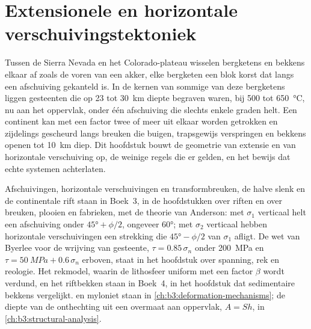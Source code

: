 \chapter{Extensionele en horizontale verschuivingstektoniek}\label{ch:b3:extension-strike-slip}

Tussen de Sierra Nevada en het Colorado-plateau wisselen bergketens en bekkens
elkaar af zoals de voren van een akker, elke bergketen een blok korst dat
langs een afschuiving gekanteld is. In de kernen van sommige van deze bergketens
liggen gesteenten die op 23 tot \qty{30}{km} diepte begraven waren, bij 500 tot \qty{650}{\celsius}, nu aan het
oppervlak, onder één afschuiving die slechts enkele graden helt. Een continent kan
met een factor twee of meer uit elkaar worden getrokken en zijdelings
gescheurd langs breuken die buigen, trapsgewijs verspringen en bekkens openen tot \qty{10}{km} diep. Dit hoofdstuk bouwt
de geometrie van extensie en van horizontale verschuiving op, de weinige regels die er
gelden, en het bewijs dat echte systemen achterlaten.

\begin{recall}
Afschuivingen, horizontale verschuivingen en transformbreuken, de halve slenk en de continentale
rift staan in Boek~3, in de hoofdstukken over riften en over breuken, plooien
en fabrieken, met de theorie van Anderson: met $\sigma_1$ verticaal helt een afschuiving
onder $\ang{45} + \phi/2$, ongeveer \ang{60}; met $\sigma_2$ verticaal hebben horizontale
verschuivingen een strekking die $\ang{45} - \phi/2$ van $\sigma_1$ afligt. De wet van Byerlee voor de
wrijving van gesteente, $\tau = 0.85\,\sigma_n$ onder \qty{200}{MPa} en $\tau =
\qty{50}{MPa} + 0.6\,\sigma_n$ erboven, staat in het hoofdstuk over spanning, rek en
reologie. Het rekmodel, waarin de lithosfeer uniform
met een factor $\beta$ wordt verdund, en het riftbekken staan in Boek~4, in het
hoofdstuk dat sedimentaire bekkens vergelijkt.  en myloniet staan in
\cref{ch:b3:deformation-mechanisms}; de diepte van de onthechting uit een overmaat
aan oppervlak, $A = Sh$, in \cref{ch:b3:structural-analysis}.
\end{recall}

